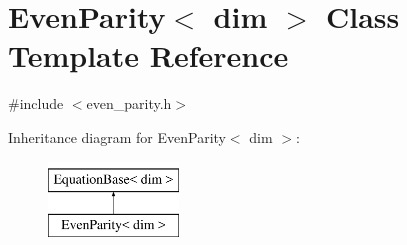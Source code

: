 \hypertarget{class_even_parity}{}\section{Even\+Parity$<$ dim $>$ Class Template Reference}
\label{class_even_parity}


{\ttfamily \#include $<$even\+\_\+parity.\+h$>$}

Inheritance diagram for Even\+Parity$<$ dim $>$\+:\begin{figure}[H]
\begin{center}
\leavevmode
\includegraphics[height=2.000000cm]{class_even_parity}
\end{center}
\end{figure}
